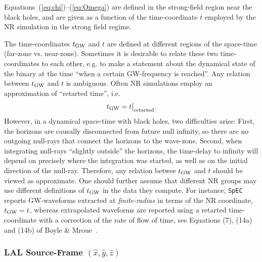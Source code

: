 \documentclass[aps,prd,amssymb,amsmath,amsfonts,superscriptaddress,
floatfix ,preprintnumbers,altaffilletter]{revtex4}
\newcommand{\tGW}{t_{\rm GW}}
\newcommand{\ExS}{{{\hat x}}}
\newcommand{\EyS}{{{\hat y}}}
\newcommand{\EzS}{{{\hat z}}}
\begin{document}
Equations~(\ref{eq:chi})--(\ref{eq:Omega}) are defined in the
strong-field region near the black holes, and are given as a function
of the time-coordinate $t$ employed by the NR simulation in the strong
field regime.

The time-coordinates $\tGW$ and $t$ are defined at different regions
of the space-time (far-zone vs. near-zone).  Sometimes it is desirable
to relate these two time-coordinates to each other, e.g. to make a
statement about the dynamical state of the binary at the time ``when a
certain GW-frequency is reached''.  Any relation between $\tGW$ and
$t$ is ambiguous.  Often NR simulations employ an approximation of
``retarted time'', i.e.
\begin{equation}
  \label{eq:tretarted}
  \tGW = t\big|_{\rm retarted}.
\end{equation}
However, in a dynamical space-time with black holes, two difficulties
arise: First, the horizons are causally disconnected from future null
infinity, so there are no outgoing null-rays that connect the horizons
to the wave-zone.  Second, when integrating null-rays ``slightly
outside'' the horizons, the time-delay to infinity will depend on
precisely where the integration was started, as well as on the initial
direction of the null-ray.  Therefore, any relation betwee $\tGW$ and
$t$ should be viewed as approximate.  One should further assume that
different NR groups may use different definitions of $\tGW$ in the
data they compute.  For instance, {\tt SpEC} reports GW-waveforms
extracted at \emph{finite-radius} in terms of the NR coordinate,
$\tGW=t$, whereas extrapolated waveforms are reported using a retarted
time-coordinate with a correction of the rate of flow of time, see
Equations (7), (14a) and (14b) of Boyle \& Mroue~\cite{Boyle:2009vi}.


\subsubsection{LAL Source-Frame \boldmath$(\ExS, \EyS, \EzS)$}
\end{document}
